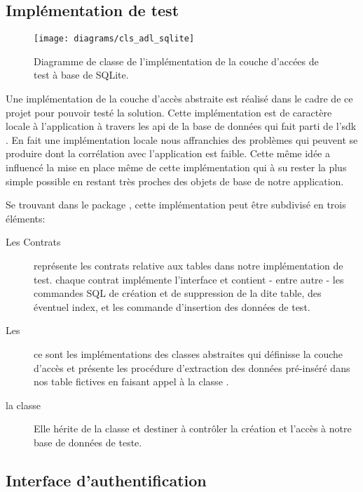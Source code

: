\subsection{Implémentation de test} 

\begin{figure}
\center
\texttt{[image: diagrams/cls\_adl\_sqlite]}
\label{fig:adl_sqlite}
\caption{Diagramme de classe de l'implémentation de la couche d'accées de test à base de SQLite.}
\end{figure}

Une implémentation de la couche d’accès abstraite est réalisé dans le
cadre de ce projet pour pouvoir testé la solution. Cette implémentation
est de caractère locale à l'application à travers les \gls{api} de la
base de données  qui fait parti de l'\gls{sdk} \android{}.
En fait une implémentation locale nous affranchies des problèmes qui
peuvent se produire dont la corrélation avec l'application est faible.
Cette même idée a influencé la mise en place même de cette
implémentation qui à su rester la plus simple possible en restant très
proches des objets de base de notre application.

Se trouvant dans le package , cette implémentation peut être subdivisé en trois éléments:

\begin{description}
\item[Les Contrats] représente les contrats relative aux tables dans notre implémentation de test. chaque contrat implémente l'interface  et contient - entre autre - les commandes SQL de création et de suppression de la dite table, des éventuel index, et les commande d'insertion des données de test.

\item[Les ] ce sont les implémentations des classes
abstraites qui définisse la couche d’accès et présente les procédure d'extraction des données pré-inséré dans nos table fictives en faisant appel à la classe  .

\item[la classe ] Elle hérite de la classe  et destiner à contrôler la création et l’accès à notre base de données de teste.
\end{description}

\subsection{Interface d'authentification}

